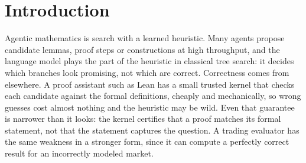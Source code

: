 \documentclass[11pt]{article}
\begin{document}
\begin{abstract}
unstarted session counted as a miss. The result carries explicit qualifications: every counted response came from Claude Opus 5.5 with no safeguard fallback, so the claim holds at that served share and does not reach the pilot's mostly fallback-answered searches; the strategy-language guide opens with a funding-fade example of the plant's shape, and the claim excludes search apart from prior; the intervals are fixed-sample and do not guarantee 95\% coverage under the stopping rule; and finding a planted signal on synthetic markets does not move the confirmation wall in real ones. Study~2, specified but not yet frozen, asks what an exact confirmer can measure on a frozen replica of a reverse-engineered long-only dip-buying vault rule, run in the Lean engine over 730 judged UTC days from the first UTC midnight at or after our freeze. Because full investment caps exposure and the study's operating power is not yet derived, its design expectation is ``not confirmed'', and its forward run is kept as a measurement. Formal methods can make certain errors impossible; they cannot turn short evidence into confirmation.
\end{abstract}

\section{Introduction}\label{sec:intro}

Agentic mathematics is search with a learned heuristic. Many agents propose candidate lemmas, proof steps or constructions at high throughput, and the language model plays the part of the heuristic in classical tree search: it decides which branches look promising, not which are correct. Correctness comes from elsewhere. A proof assistant such as Lean has a small trusted kernel that checks each candidate against the formal definitions, cheaply and mechanically, so wrong guesses cost almost nothing and the heuristic may be wild. Even that guarantee is narrower than it looks: the kernel certifies that a proof matches its formal statement, not that the statement captures the question. A trading evaluator has the same weakness in a stronger form, since it can compute a perfectly correct result for an incorrectly modeled market.
\end{document}
